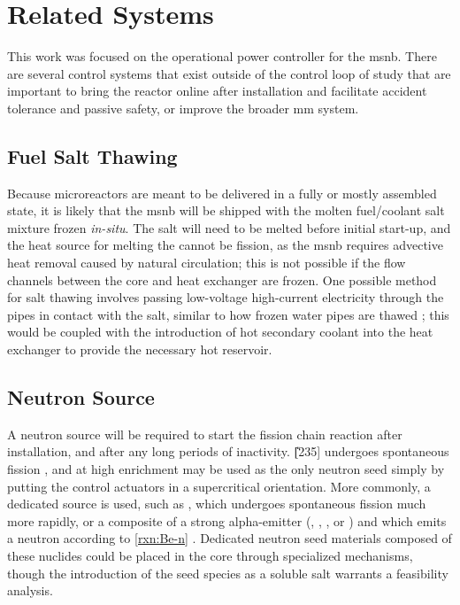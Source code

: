 \section{Related Systems}\label{Chapter:Conclusions-FutureWork}
This work was focused on the operational power controller for the \acs{msnb}. There are several control systems that exist outside of the control loop of study that are important to bring the reactor online after installation and facilitate accident tolerance and passive safety, or improve the broader \acs{mm} system.

\subsection{Fuel Salt Thawing}
Because microreactors are meant to be delivered in a fully or mostly assembled state, it is likely that the \acs{msnb} will be shipped with the molten fuel/coolant salt mixture frozen \textit{in-situ}. The salt will need to be melted before initial start-up, and the heat source for melting the cannot be fission, as the \acs{msnb} requires advective heat removal caused by natural circulation; this is not possible if the flow channels between the core and heat exchanger are frozen. One possible method for salt thawing involves passing low-voltage high-current electricity through the pipes in contact with the salt, similar to how frozen water pipes are thawed \cite{Thawing}; this would be coupled with the introduction of hot secondary coolant into the heat exchanger to provide the necessary hot reservoir.

\subsection{Neutron Source}
A neutron source will be required to start the fission chain reaction after installation, and after any long periods of inactivity. \U[235] undergoes spontaneous fission \cite[Ch. 6]{Faw}, and at high enrichment may be used as the only neutron seed simply by putting the control actuators in a supercritical orientation. More commonly, a dedicated source is used, such as \Ca[252], which undergoes spontaneous fission much more rapidly, or a composite of a strong alpha-emitter (\eg \Pu[238], \Am[241], \Po[210], or \Ra[226]) and \Be[9] which emits a neutron according to \ref{rxn:Be-n} \cite[Ch. 2]{Handbook}. Dedicated neutron seed materials composed of these nuclides could be placed in the core through specialized mechanisms, though the introduction of the seed species as a soluble salt warrants a feasibility analysis.  


